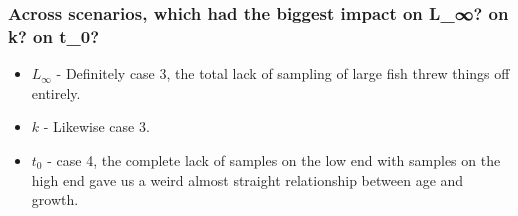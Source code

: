 \documentclass[
]{article}
\providecommand{\tightlist}{%
  \setlength{\itemsep}{0pt}\setlength{\parskip}{0pt}}
\begin{document}
\hypertarget{across-scenarios-which-had-the-biggest-impact-on-l_-on-k-on-t_0}{%
\subsubsection{Across scenarios, which had the biggest impact on L\_∞?
on k? on
t\_0?}\label{across-scenarios-which-had-the-biggest-impact-on-l_-on-k-on-t_0}}

\begin{itemize}
\tightlist
\item
  \(L_{\infty}\) - Definitely case 3, the total lack of sampling of
  large fish threw things off entirely.
\item
  \(k\) - Likewise case 3.
\item
  \(t_0\) - case 4, the complete lack of samples on the low end with
  samples on the high end gave us a weird almost straight relationship
  between age and growth.
\end{itemize}
\end{document}
